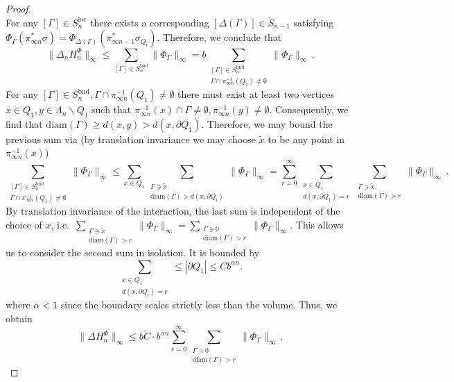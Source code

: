 \documentclass[10pt,a4paper]{amsart}
\newcommand{\bnd}{\mathrm{bnd}}
\newcommand{\diam}{\mathrm{diam}}
\newcommand{\loc}{\mathrm{loc}}
\begin{document}
\begin{proof}
\begin{equation}
    \end{equation}
    For any $[\Gamma]\in S_n^\loc$ there exists a corresponding $[\Delta(\Gamma)]\in S_{n-1}$ satisfying $\Phi_\Gamma(\pi_{\infty n}^*\sigma)=\Phi_{\Delta(\Gamma)}(\pi_{\infty n-1}^*\sigma_{Q_i})$. Therefore, we conclude that
    \begin{equation}
        \|\Delta _nH_n^\Phi\|_\infty\leq\sum_{[\Gamma]\in S_n^\bnd}\|\Phi_\Gamma\|_\infty=b\sum_{\substack{[\Gamma]\in S_n^\bnd\\\Gamma\cap \pi_{\infty n}^{-1}(Q_1)\ne\emptyset}}\|\Phi_\Gamma\|_\infty\,.
    \end{equation}
    For any $[\Gamma]\in S_n^\bnd,\Gamma\cap\pi_{\infty n}^{-1}(Q_1)\neq\emptyset$ there must exist at least two vertices $x\in Q_1,y\in \Lambda_n\backslash Q_1$ such that $\pi_{\infty n}^{-1}(x)\cap\Gamma\neq\emptyset,\pi_{\infty n}^{-1}(y)\neq\emptyset$. Consequently, we find that $\diam(\Gamma)\geq d(x,y)> d(x,\partial Q_1)$. Therefore, we may bound the previous sum via (by translation invariance we may choose $\tilde x$ to be any point in $\pi_{\infty n}^{-1}(x)$) 
    \begin{equation}
        \sum_{\substack{[\Gamma]\in S_n^\bnd\\\Gamma\cap\pi_{\infty n}^{-1}(Q_1)\ne\emptyset}}\|\Phi_\Gamma\|_\infty\leq\sum_{x\in Q_1}\sum_{\substack{\Gamma\ni\tilde x\\\diam(\Gamma)> d(x,\partial Q_i)}}\|\Phi_\Gamma\|_\infty=\sum_{r=0}^\infty\sum_{\substack{x\in Q_1\\d(x,\partial Q_1)=r}}\sum_{\substack{\Gamma\ni\tilde x\\\diam(\Gamma)>r}}\|\Phi_\Gamma\|_\infty\,.
    \end{equation}
    By translation invariance of the interaction, the last sum is independent of the choice of $x$, i.e.\ $\sum_{\substack{\Gamma\ni\tilde x\\\diam(\Gamma)>r}}\|\Phi_\Gamma\|_\infty=\sum_{\substack{\Gamma\ni0\\\diam(\Gamma)>r}}\|\Phi_\Gamma\|_\infty$. This allows us to consider the second sum in isolation. It is bounded by
    \begin{equation}
        \sum_{\substack{x\in Q_1\\d(x,\partial Q_i)=r}}\leq|\partial Q_1|\leq Cb^{\alpha n}.
    \end{equation}
    where $\alpha<1$ since the boundary scales strictly less than the volume. Thus, we obtain
    \begin{equation}
        \|\Delta H_n^\Phi\|_\infty\leq b\tilde C\cdot b^{\alpha n}\sum_{r=0}^\infty\sum_{\substack{\Gamma\ni0\\\diam(\Gamma)>r}}\|\Phi_\Gamma\|_\infty\,.

\end{equation}
\end{proof}
\end{document}
